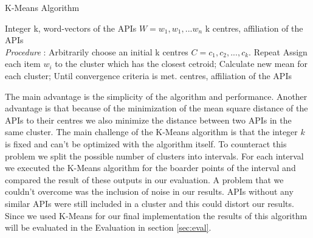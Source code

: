 \documentclass[a4paper]{IEEEtran}
\begin{document}
\begin{algorithm}[H]
 \caption{K-Means Algorithm}
 \label{Algorithm 3}
 \begin{algorithmic}[1]
\renewcommand{\algorithmicrequire}{\textbf{Input:}}
 \renewcommand{\algorithmicensure}{\textbf{Output:}}
 \REQUIRE Integer k, \newline word-vectors of the APIs $W={w_1, w_1, ... w_n}$
 \ENSURE  k centres, affiliation of the APIs
 \\ \textit{Procedure} :
  \STATE Arbitrarily choose an initial k centres $C = {c_1, c_2, ..., c_k}$.
 \STATE Repeat \newline
\noindent\hspace*{5mm}%
			Assign each item $w_i$ to the cluster which has \newline 
\noindent\hspace*{5mm}%
			the closest cetroid;\newline
\noindent\hspace*{5mm}%
			Calculate new mean for each cluster;\newline
	Until convergence criteria is met.
\RETURN centres, affiliation of the APIs
 \end{algorithmic}
 \end{algorithm}



The main advantage is the simplicity of the algorithm and performance. Another advantage is that because of the minimization of the mean square distance of the APIs to their centres we also minimize the distance between two APIs in the same cluster.
The main challenge of the K-Means algorithm is that the integer $k$ is fixed and can’t be optimized with the algorithm itself. To counteract this problem we split the possible number of clusters into intervals. For each interval we executed the K-Means algorithm for the boarder points of the interval and compared the result of these outputs in our evaluation.
A problem that we couldn’t overcome was the inclusion of noise in our results. APIs without any similar APIs were still included in a cluster and this could distort our results.
Since we used K-Means for our final implementation the results of this algorithm will be evaluated in the Evaluation in section \ref{sec:eval}.
\end{document}
